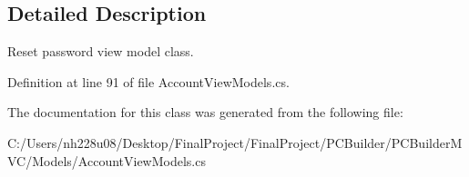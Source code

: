 \subsection{Detailed Description}
Reset password view model class. 



Definition at line 91 of file Account\+View\+Models.\+cs.



The documentation for this class was generated from the following file\+:\begin{DoxyCompactItemize}
\item 
C\+:/\+Users/nh228u08/\+Desktop/\+Final\+Project/\+Final\+Project/\+P\+C\+Builder/\+P\+C\+Builder\+M\+V\+C/\+Models/Account\+View\+Models.\+cs\end{DoxyCompactItemize}
